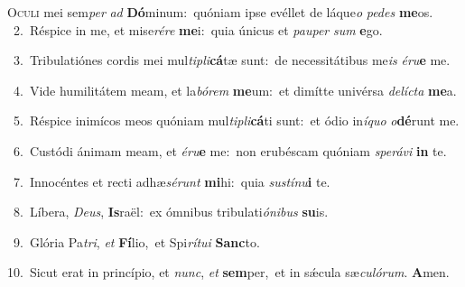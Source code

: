 \lettrine{\initial\textcolor{\initialcolor}{O}}{culi} mei sem\textit{per} \textit{ad} \textbf{Dó}\-minum:~\star quóniam ipse evéllet de láque\textit{o} \textit{pe}\-\textit{des} \textbf{me}\-os.\\
{\numbfont\textcolor{\numbcolor}{~2.}}~Réspice in me, et mise\-\textit{ré}\-\textit{re} \textbf{me}\-i:~\star quia únicus et \textit{pau}\-\textit{per} \textit{sum} \textbf{e}\-go.\par
{\numbfont\textcolor{\numbcolor}{~3.}}~Tribulatiónes cordis mei mul\-\textit{ti}\-\textit{pli}\textbf{cá}tæ sunt:~\star de necessitátibus me\textit{is} \textit{é}\-\textit{ru}\textbf{e} me.\par
{\numbfont\textcolor{\numbcolor}{~4.}}~Vide humilitátem meam, et la\-\textit{bó}\-\textit{rem} \textbf{me}\-um:~\star et dimítte univérsa \textit{de}\-\textit{líc}\textit{ta} \textbf{me}\-a.\par
{\numbfont\textcolor{\numbcolor}{~5.}}~Réspice inimícos meos quóniam mul\-\textit{ti}\-\textit{pli}\textbf{cá}ti sunt:~\star et ódio in\-\textit{í}\-\textit{quo} \textit{o}\-\textbf{dé}runt me.\par
{\numbfont\textcolor{\numbcolor}{~6.}}~Custódi ánimam meam, et \textit{é}\-\textit{ru}\textbf{e} me:~\star non erubéscam quóniam \textit{spe}\-\textit{rá}\textit{vi} \textbf{in} te.\par
{\numbfont\textcolor{\numbcolor}{~7.}}~Innocéntes et recti adhæ\-\textit{sé}\-\textit{runt} \textbf{mi}\-hi:~\star quia \textit{sus}\-\textit{tí}\textit{nu}\textbf{i} te.\par
{\numbfont\textcolor{\numbcolor}{~8.}}~Líbera, \textit{De}\-\textit{us}, \textbf{Is}\-raël:~\star ex ómnibus tribulati\-\textit{ó}\-\textit{ni}\textit{bus} \textbf{su}\-is.\par
{\numbfont\textcolor{\numbcolor}{~9.}}~Glória Pa\-\textit{tri}\-, \textit{et} \textbf{Fí}\-lio,~\star et Spi\-\textit{rí}\-\textit{tu}\textit{i} \textbf{Sanc}\-to.\par
{\numbfont\textcolor{\numbcolor}{10.}}~Sicut erat in princípio, et \textit{nunc}\-, \textit{et} \textbf{sem}\-per,~\star et in sǽcula sæ\-\textit{cu}\-\textit{ló}\textit{rum}. \textbf{A}\-men.\par
